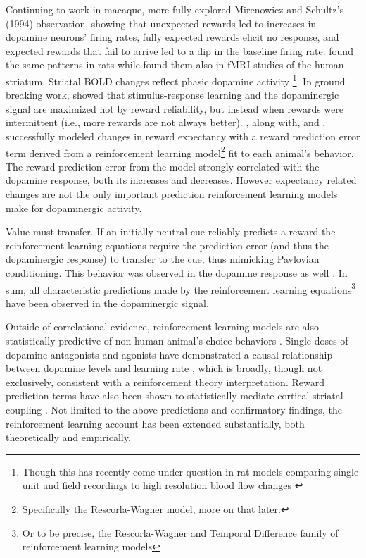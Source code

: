 \label{subsub:expectations}
Continuing to work in macaque, \citet{Hollerman:1998qy} more fully explored Mirenowicz and Schultz's (1994) observation, showing that unexpected rewards led to increases in dopamine neurons' firing rates, fully expected rewards elicit no response, and expected rewards that fail to arrive led to a dip in the baseline firing rate.   \citet{Roesch:2007p2519} found the same patterns in rats while \citet{ODoherty:2003p6329} found them also in fMRI studies of the human striatum.  Striatal BOLD changes reflect phasic dopamine activity \citep{Schonberg:2009p6669,Surmeier:2007p4435}\footnote{
    Though this has recently come under question in rat models comparing single unit and field recordings to high resolution blood flow changes \citep{Mishra:2011p9095}}. In ground breaking work, \citet{Waelti:2001p6523} showed that stimulus-response learning and the dopaminergic signal are maximized not by reward reliability, but instead when rewards were intermittent (i.e., more rewards are not always better).  \citet{Waelti:2001p6523}, along with, \citet{Fiorillo:2003p6375} and \citet{Bayer:2005ul}, successfully modeled changes in reward expectancy with a reward prediction error term derived from a reinforcement learning model\footnote{
    Specifically the Rescorla-Wagner model, more on that later.
} fit to each animal's behavior. The reward prediction error from the model strongly correlated with the dopamine response, both its increases and decreases. However expectancy related changes are not the only important prediction reinforcement learning models make for dopaminergic activity.  

Value must transfer.  If an initially neutral cue reliably predicts a reward the reinforcement learning equations require the prediction error (and thus the dopaminergic response) to transfer to the cue, thus mimicking Pavlovian conditioning.  This behavior was observed in the dopamine response as well \citep{Roesch:2007p2519, McClure:2003p3346}.  In sum, all characteristic predictions made by the reinforcement learning equations\footnote{
    Or to be precise, the Rescorla-Wagner and Temporal Difference family of reinforcement learning models} 
have been observed in the dopaminergic signal.  

Outside of correlational evidence, reinforcement learning models are also statistically predictive of non-human animal's choice behaviors \citep{Hampton:2007p2983}.  Single doses of dopamine antagonists and agonists have demonstrated a causal relationship between dopamine levels and learning rate \citep{Pizzagalli:2008p6521, Diaconescu:2010p7631}, which is broadly, though not exclusively, consistent with a reinforcement theory interpretation.  Reward prediction terms have also been shown to statistically mediate cortical-striatal coupling \citep{denOuden:2010p7203}.  Not limited to the above predictions and confirmatory findings, the reinforcement learning account has been extended substantially, both theoretically and empirically.

